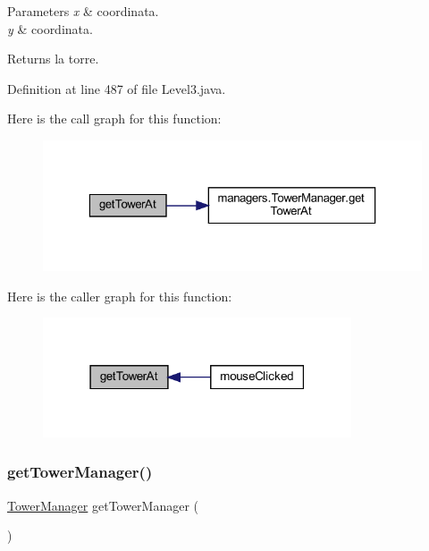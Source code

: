\begin{DoxyParams}{Parameters}
{\em x} & coordinata. \\
\hline
{\em y} & coordinata.\\
\hline
\end{DoxyParams}
\begin{DoxyReturn}{Returns}
la torre. 
\end{DoxyReturn}


Definition at line 487 of file Level3.\+java.

Here is the call graph for this function\+:
\nopagebreak
\begin{figure}[H]
\begin{center}
\leavevmode
\includegraphics[width=323pt]{classscenes_1_1_level3_a4345f2e80059788e5ab1dd1cf0ff2c04_cgraph}
\end{center}
\end{figure}
Here is the caller graph for this function\+:\nopagebreak
\begin{figure}[H]
\begin{center}
\leavevmode
\includegraphics[width=259pt]{classscenes_1_1_level3_a4345f2e80059788e5ab1dd1cf0ff2c04_icgraph}
\end{center}
\end{figure}
\mbox{\label{classscenes_1_1_level3_a6fff8a01141127e3c2897a077e5dee92}} 
\subsubsection{\texorpdfstring{get\+Tower\+Manager()}{getTowerManager()}}
{\footnotesize\ttfamily \hyperlink{classmanagers_1_1_tower_manager}{Tower\+Manager} get\+Tower\+Manager (\begin{DoxyParamCaption}{ }\end{DoxyParamCaption})}



